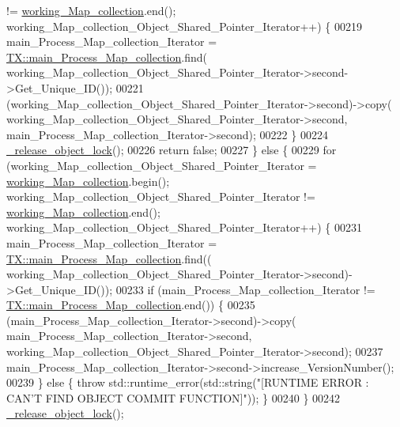 \begin{DoxyCode}
       != \hyperlink{class_t_x_a81aafda16e2f20e36ec6c68e584668ff_a81aafda16e2f20e36ec6c68e584668ff}{working\_Map\_collection}.end(); 
      working\_Map\_collection\_Object\_Shared\_Pointer\_Iterator++) \{
00219             main\_Process\_Map\_collection\_Iterator  = 
      \hyperlink{class_t_x_a1a45d726894190695314464d7cd97c29_a1a45d726894190695314464d7cd97c29}{TX::main\_Process\_Map\_collection}.find(
      working\_Map\_collection\_Object\_Shared\_Pointer\_Iterator->second->Get\_Unique\_ID());
00221             (working\_Map\_collection\_Object\_Shared\_Pointer\_Iterator->second)->copy(
      working\_Map\_collection\_Object\_Shared\_Pointer\_Iterator->second, main\_Process\_Map\_collection\_Iterator->second);
00222         \}
00224         \hyperlink{class_t_x_a4c13d2015dc15d0f788fa9a1413f0463_a4c13d2015dc15d0f788fa9a1413f0463}{\_release\_object\_lock}();
00226         \textcolor{keywordflow}{return} \textcolor{keyword}{false};
00227     \} \textcolor{keywordflow}{else} \{
00229         \textcolor{keywordflow}{for} (working\_Map\_collection\_Object\_Shared\_Pointer\_Iterator = 
      \hyperlink{class_t_x_a81aafda16e2f20e36ec6c68e584668ff_a81aafda16e2f20e36ec6c68e584668ff}{working\_Map\_collection}.begin(); working\_Map\_collection\_Object\_Shared\_Pointer\_Iterator
       != \hyperlink{class_t_x_a81aafda16e2f20e36ec6c68e584668ff_a81aafda16e2f20e36ec6c68e584668ff}{working\_Map\_collection}.end(); 
      working\_Map\_collection\_Object\_Shared\_Pointer\_Iterator++) \{
00231                 main\_Process\_Map\_collection\_Iterator = 
      \hyperlink{class_t_x_a1a45d726894190695314464d7cd97c29_a1a45d726894190695314464d7cd97c29}{TX::main\_Process\_Map\_collection}.find((
      working\_Map\_collection\_Object\_Shared\_Pointer\_Iterator->second)->Get\_Unique\_ID());
00233                 \textcolor{keywordflow}{if} (main\_Process\_Map\_collection\_Iterator != 
      \hyperlink{class_t_x_a1a45d726894190695314464d7cd97c29_a1a45d726894190695314464d7cd97c29}{TX::main\_Process\_Map\_collection}.end()) \{
00235                     (main\_Process\_Map\_collection\_Iterator->second)->copy(
      main\_Process\_Map\_collection\_Iterator->second, working\_Map\_collection\_Object\_Shared\_Pointer\_Iterator->second);
00237                     main\_Process\_Map\_collection\_Iterator->second->increase\_VersionNumber();
00239                 \} \textcolor{keywordflow}{else} \{ \textcolor{keywordflow}{throw} std::runtime\_error(std::string(\textcolor{stringliteral}{"[RUNTIME ERROR : CAN'T FIND OBJECT COMMIT
       FUNCTION]"})); \}
00240         \}
00242         \hyperlink{class_t_x_a4c13d2015dc15d0f788fa9a1413f0463_a4c13d2015dc15d0f788fa9a1413f0463}{\_release\_object\_lock}();

\end{DoxyCode}
